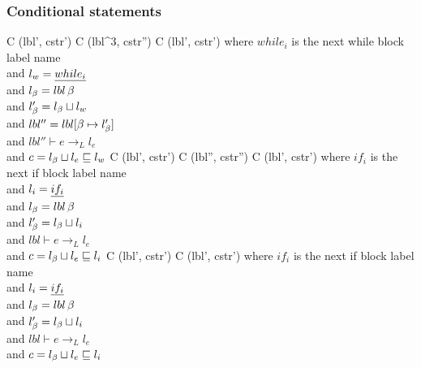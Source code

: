 \subsubsection{Conditional statements}

\begin{trules}
        { {C} {(lbl', cstr')} }
        { {C} {(lbl^3, cstr'')} \;
          {C} {(lbl', cstr')} }
        {where $while_i$ is the next while block label name\\
          and $l_w = \underline{while_i}$\\
          and $l_\beta = lbl \, \beta$\\
          and $l_\beta' = l_\beta \sqcup l_w$\\
          and $lbl'' = lbl[\beta \mapsto l_\beta']$\\
          and $lbl'' \vdash e \rightarrow_L l_e$\\
          and $c = l_\beta \sqcup l_e \sqsubseteq l_w$}
        { {C} {(lbl', cstr')}}
        { {C} {(lbl'', cstr'')} \;
          {C} {(lbl', cstr')} }
        {where $if_i$ is the next if block label name\\
          and $l_i = \underline{if_i}$\\
          and $l_\beta = lbl \, \beta$\\
          and $l_\beta' = l_\beta \sqcup l_i$\\
          and $lbl \vdash e \rightarrow_L l_e$\\
          and $c = l_\beta \sqcup l_e \sqsubseteq l_i$}
        { {C} {(lbl', cstr')}}
        {
         { {C} {(lbl', cstr')} }}
        {where $if_i$ is the next if block label name\\
          and $l_i = \underline{if_i}$\\
          and $l_\beta = lbl \, \beta$\\
          and $l_\beta' = l_\beta \sqcup l_i$\\
          and $lbl \vdash e \rightarrow_L l_e$\\
          and $c = l_\beta \sqcup l_e \sqsubseteq l_i$}
\end{trules}

